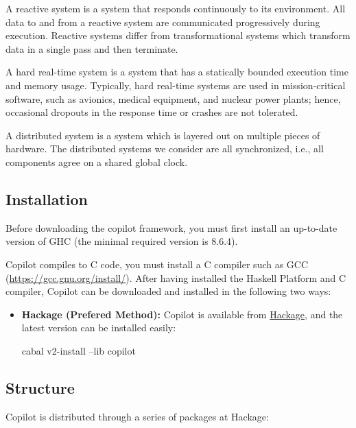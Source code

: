 A reactive system is a system that responds continuously to its environment.
%
All data to and from a reactive system are communicated progressively during
execution.
%
 Reactive systems differ from transformational systems which transform data in
a single pass and then terminate.
%

A hard real-time system is a system that has a statically bounded execution
time and memory usage.
%
 Typically, hard real-time systems are used in mission-critical software, such
as avionics, medical equipment, and nuclear power plants; hence, occasional
dropouts in the response time or crashes are not tolerated.

A distributed system is a system which is layered out on multiple pieces of
hardware.
%
The distributed systems we consider are all synchronized, i.e., all components
agree on a shared global clock.


\subsection{Installation} \label{sec:install}

Before downloading the copilot framework, you must first install an
up-to-date version of GHC (the minimal required version is 8.6.4).
%

\noindent Copilot compiles to C code, you must install a C compiler such as GCC (\url{https://gcc.gnu.org/install/}). After having installed the Haskell Platform and C compiler, Copilot can be downloaded and
installed in the following two ways:

\begin{itemize}
\item \textbf{Hackage (Prefered Method): } Copilot is available from
\href{https://hackage.haskell.org/package/copilot-3.16#table-of-contents}{Hackage},
and the latest version can be installed easily:
\begin{code}
cabal v2-install --lib copilot
\end{code}

\end{itemize}


\subsection{Structure} \label{structure}

\noindent Copilot is distributed through a series of packages at Hackage:

